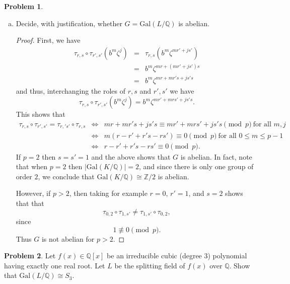 \documentclass[11pt]{article}
\newcommand{\Q}{\mathbb{Q}}
\newcommand{\Z}{\mathbb{Z}}
\theoremstyle{definition}
\newtheorem{problem}{Problem}
\begin{document}
\begin{problem}
\begin{enumerate}[(a)]
\item Decide, with justification, whether $G=\mathrm{Gal}(L/\Q)$ is abelian.

\begin{proof}
First, we have
$$\begin{aligned}
\tau_{r,s}\circ\tau_{r',s'}(b^m\zeta^j) & = & \tau_{r,s}( b^m\zeta^{mr'+js'})\\
&=&  b^m\zeta^{mr+(mr'+js')s} \\
&=&  b^m\zeta^{mr+mr's+js's} 
\end{aligned}$$
and thus, interchanging the roles of $r,s$ and $r',s'$ we have
$$\tau_{r,s}\circ\tau_{r',s'}(b^m\zeta^j)  =   b^m\zeta^{mr'+mrs'+js's}. $$
This shows that
\begin{eqnarray*}
 \tau_{r,s}\circ\tau_{r',s'}=\tau_{r,'s'}\circ\tau_{r,s} &\iff & mr+mr's+js's\equiv mr'+mrs'+js's \!\!\!\pmod{p} \ \textrm{for all } m,j \\
 &\iff & m(r-r'+r's-rs')\equiv 0 \!\!\pmod{p} \ \textrm{for all } 0\leqslant m \leqslant p-1\\
&\iff & r-r'+r's-rs'\equiv 0 \!\pmod{p}.
 \end{eqnarray*}
If $p=2$ then $s=s'=1$ and the above shows that $G$ is abelian. In fact, note that when $p=2$ then $|\mathrm{Gal}(K/\Q)| = 2$, and since there is only one group of order $2$, we conclude that $\mathrm{Gal}(K/\Q) \cong \Z/2$ is abelian.

However, if $p>2$, then taking for example $r=0$, $r'=1$, and $s=2$ shows that that 
$$\tau_{0,2}\circ\tau_{1,s'}\neq \tau_{1,s'}\circ\tau_{0,2},$$
since
$$1 \not\equiv 0 \!\!\pmod p.$$ 
Thus $G$ is not abelian for $p>2$.
\end{proof}

\end{enumerate}
\end{problem}

\begin{problem}
	Let $f(x) \in \Q[x]$ be an irreducible cubic (degree $3$) polynomial having exactly one real root. 
Let $L$ be the splitting field of $f(x)$ over $\Q$. Show that $\mathrm{Gal}(L/\Q) \cong S_3$.
\end{problem}
\end{document}
